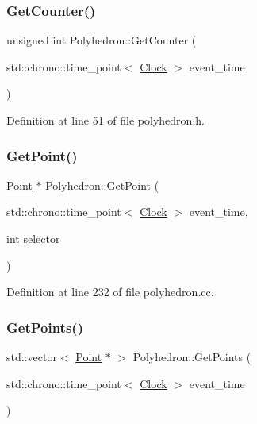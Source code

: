 \subsubsection{\texorpdfstring{Get\+Counter()}{GetCounter()}}
{\footnotesize\ttfamily unsigned int Polyhedron\+::\+Get\+Counter (\begin{DoxyParamCaption}\item[{std\+::chrono\+::time\+\_\+point$<$ \mbox{\hyperlink{universe_8h_a0ef8d951d1ca5ab3cfaf7ab4c7a6fd80}{Clock}} $>$}]{event\+\_\+time }\end{DoxyParamCaption})\hspace{0.3cm}{\ttfamily [inline]}}



Definition at line 51 of file polyhedron.\+h.

\mbox{\label{class_polyhedron_a4d61f89c56e15d96008856cfb540d558}} 
\subsubsection{\texorpdfstring{Get\+Point()}{GetPoint()}}
{\footnotesize\ttfamily \mbox{\hyperlink{class_point}{Point}} $\ast$ Polyhedron\+::\+Get\+Point (\begin{DoxyParamCaption}\item[{std\+::chrono\+::time\+\_\+point$<$ \mbox{\hyperlink{universe_8h_a0ef8d951d1ca5ab3cfaf7ab4c7a6fd80}{Clock}} $>$}]{event\+\_\+time,  }\item[{int}]{selector }\end{DoxyParamCaption})}



Definition at line 232 of file polyhedron.\+cc.

\mbox{\label{class_polyhedron_a1430429d6c8447e90b8c94ca46496a59}} 
\subsubsection{\texorpdfstring{Get\+Points()}{GetPoints()}}
{\footnotesize\ttfamily std\+::vector$<$ \mbox{\hyperlink{class_point}{Point}} $\ast$ $>$ Polyhedron\+::\+Get\+Points (\begin{DoxyParamCaption}\item[{std\+::chrono\+::time\+\_\+point$<$ \mbox{\hyperlink{universe_8h_a0ef8d951d1ca5ab3cfaf7ab4c7a6fd80}{Clock}} $>$}]{event\+\_\+time }\end{DoxyParamCaption})}



